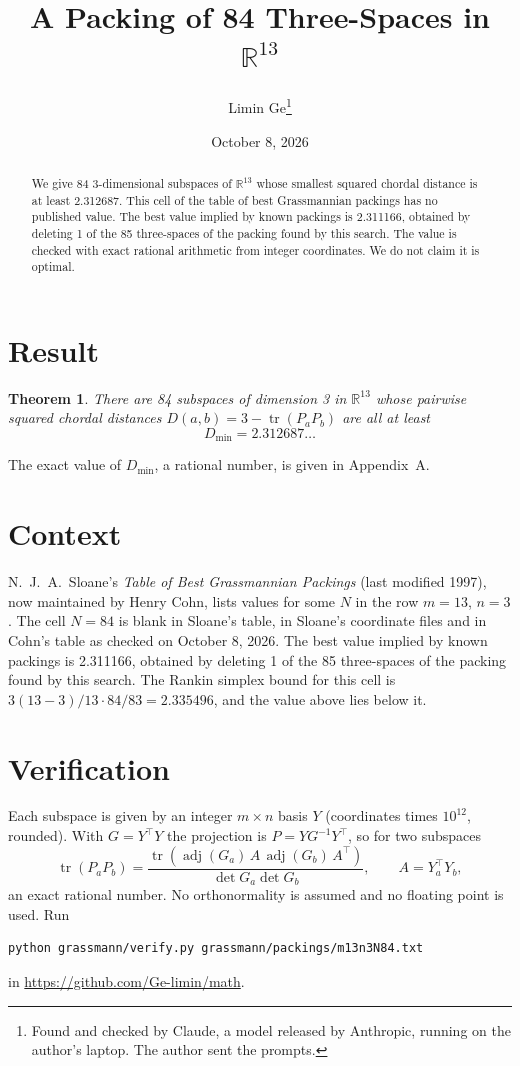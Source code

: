 \documentclass[11pt,a4paper]{article}
\title{A Packing of 84 Three-Spaces in $\mathbb{R}^{13}$}
\author{Limin Ge\thanks{Found and checked by Claude, a model released by Anthropic, running on the author's laptop. The author sent the prompts.}}
\date{October 8, 2026}
\newtheorem*{theorem}{Theorem}
\begin{document}
\maketitle
\begin{abstract}
We give 84 3-dimensional subspaces of $\mathbb{R}^{13}$ whose smallest squared chordal distance is at least 2.312687. This cell of the table of best Grassmannian packings has no published value. The best value implied by known packings is 2.311166, obtained by deleting 1 of the 85 three-spaces of the packing found by this search. The value is checked with exact rational arithmetic from integer coordinates. We do not claim it is optimal.
\end{abstract}

\section{Result}
\begin{theorem}
There are 84 subspaces of dimension 3 in $\mathbb{R}^{13}$ whose pairwise squared chordal distances $D(a,b) = 3 - \operatorname{tr}(P_aP_b)$ are all at least
\[ D_{\min} = 2.312687\ldots \]
\end{theorem}
The exact value of $D_{\min}$, a rational number, is given in Appendix~A.


\section{Context}
N.~J.~A.~Sloane's \emph{Table of Best Grassmannian Packings} (last modified 1997), now maintained by Henry Cohn, lists values for some $N$ in the row $m=13$, $n=3$. The cell $N=84$ is blank in Sloane's table, in Sloane's coordinate files and in Cohn's table as checked on October 8, 2026. The best value implied by known packings is 2.311166, obtained by deleting 1 of the 85 three-spaces of the packing found by this search. The Rankin simplex bound for this cell is $3(13-3)/13\cdot 84/83 = 2.335496$, and the value above lies below it.


\section{Verification}
Each subspace is given by an integer $m\times n$ basis $Y$ (coordinates times $10^{12}$, rounded). With $G=Y^\top Y$ the projection is $P=YG^{-1}Y^\top$, so for two subspaces
\[ \operatorname{tr}(P_aP_b)=\frac{\operatorname{tr}(\operatorname{adj}(G_a)\,A\,\operatorname{adj}(G_b)\,A^\top)}{\det G_a\det G_b},\qquad A=Y_a^\top Y_b, \]
an exact rational number. No orthonormality is assumed and no floating point is used. Run
\begin{verbatim}
python grassmann/verify.py grassmann/packings/m13n3N84.txt
\end{verbatim}
in \url{https://github.com/Ge-limin/math}.
\end{document}
